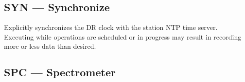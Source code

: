 \subsection{SYN --- Synchronize}
\label{cmd:syn}
\begin{description}[style=nextline]
    \item[Description:]
        Explicitly synchronizes the DR clock with the station NTP time server.
        Executing while operations are scheduled or in progress may result in
        recording more or less data than desired.
\end{description}

\subsection{SPC --- Spectrometer}
\label{cmd:spc}

